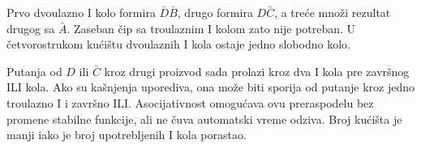 
Prvo dvoulazno I kolo formira \(\bar D\bar B\), drugo formira \(D\bar C\), a treće množi rezultat drugog sa \(\bar A\). Zaseban čip sa troulaznim I kolom zato nije potreban. U četvorostrukom kućištu dvoulaznih I kola ostaje jedno slobodno kolo.

Putanja od \(D\) ili \(\bar C\) kroz drugi proizvod sada prolazi kroz dva I kola pre završnog ILI kola. Ako su kašnjenja uporediva, ona može biti sporija od putanje kroz jedno troulazno I i završno ILI. Asocijativnost omogućava ovu preraspodelu bez promene stabilne funkcije, ali ne čuva automatski vreme odziva. Broj kućišta je manji iako je broj upotrebljenih I kola porastao.
